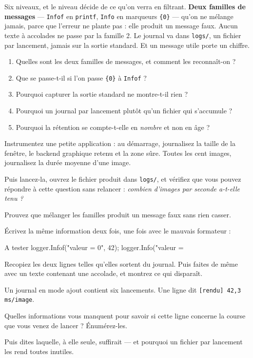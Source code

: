 \begin{nkbilan}
Six niveaux, et le niveau décide de ce qu'on verra en filtrant. \textbf{Deux
familles de messages} --- \texttt{Infof} en \texttt{printf}, \texttt{Info} en
marqueurs \texttt{\{0\}} --- qu'on ne mélange jamais, parce que l'erreur ne
plante pas : elle produit un message faux. Aucun texte à accolades ne passe par
la famille 2. Le journal va dans \texttt{logs/}, un fichier par lancement, jamais
sur la sortie standard. Et un message utile porte un chiffre.
\end{nkbilan}

\begin{nkquestions}
\begin{enumerate}
\item Quelles sont les deux familles de messages, et comment les reconnaît-on ?
\item Que se passe-t-il si l'on passe \texttt{\{0\}} à \texttt{Infof} ?
\item Pourquoi capturer la sortie standard ne montre-t-il rien ?
\item Pourquoi un journal par lancement plutôt qu'un fichier qui s'accumule ?
\item Pourquoi la rétention se compte-t-elle en \emph{nombre} et non en âge ?
\end{enumerate}
\end{nkquestions}

\begin{nkpratique}
Instrumentez une petite application : au démarrage, journalisez la taille de la
fenêtre, le backend graphique retenu et la zone sûre. Toutes les cent images,
journalisez la durée moyenne d'une image.

Puis lancez-la, ouvrez le fichier produit dans \texttt{logs/}, et vérifiez que
vous pouvez répondre à cette question sans relancer : \emph{combien d'images par
seconde a-t-elle tenu ?}
\end{nkpratique}

\begin{nkdemo}
Prouvez que mélanger les familles produit un message faux sans rien casser.

Écrivez la même information deux fois, une fois avec le mauvais formateur :

\begin{nkcode}{A tester}
logger.Infof("valeur = {0}\n", 42);
logger.Info("valeur = %
\end{nkcode}

Recopiez les deux lignes telles qu'elles sortent du journal. Puis faites de même
avec un texte contenant une accolade, et montrez ce qui disparaît.
\end{nkdemo}

\begin{nklogique}
Un journal en mode ajout contient six lancements. Une ligne dit
\texttt{[rendu] 42,3 ms/image}.

Quelles informations vous manquent pour savoir si cette ligne concerne la course
que vous venez de lancer ? Énumérez-les.

Puis dites laquelle, à elle seule, suffirait --- et pourquoi un fichier par
lancement les rend toutes inutiles.
\end{nklogique}
